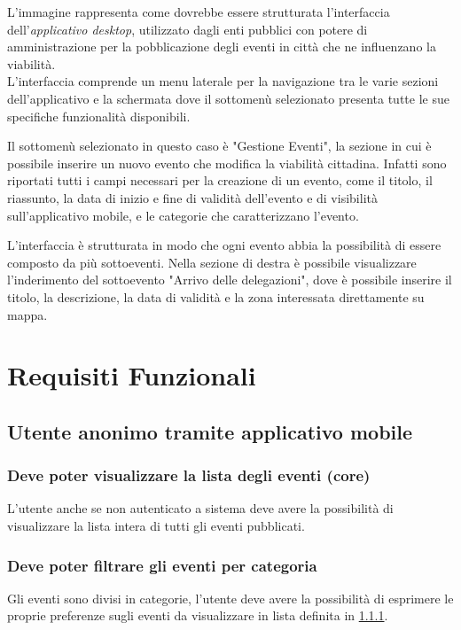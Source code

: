\documentclass{article}
\begin{document}
L'immagine rappresenta come dovrebbe essere strutturata l'interfaccia dell'\textit{applicativo desktop}, utilizzato dagli enti pubblici con potere di amministrazione per la pobblicazione degli eventi in città che ne influenzano la viabilità.\\
L'interfaccia comprende un menu laterale per la navigazione tra le varie sezioni dell'applicativo e la schermata dove il sottomenù selezionato presenta tutte le sue specifiche funzionalità disponibili.

Il sottomenù selezionato in questo caso è "Gestione Eventi", la sezione in cui è possibile inserire un nuovo evento che modifica la viabilità cittadina. Infatti sono riportati tutti i campi necessari per la creazione di un evento, come il titolo, il riassunto, la data di inizio e fine di validità dell'evento e di visibilità sull'applicativo mobile, e le categorie che caratterizzano l'evento.

L'interfaccia è strutturata in modo che ogni evento abbia la possibilità di essere composto da più sottoeventi. Nella sezione di destra è possibile visualizzare l'inderimento del sottoevento "Arrivo delle delegazioni", dove è possibile inserire il titolo, la descrizione, la data di validità e la zona interessata direttamente su mappa.\\

\clearpage

\section{Requisiti Funzionali}

\subsection{Utente anonimo tramite applicativo mobile}

\subsubsection{Deve poter visualizzare la lista degli eventi (core)}\label{Requirements:Lista}
\label{5.1.1}
L'utente anche se non autenticato a sistema deve avere la possibilità di visualizzare la lista intera di tutti gli eventi pubblicati.

\subsubsection{Deve poter filtrare gli eventi per categoria}
\label{5.1.2}
Gli eventi sono divisi in categorie, l'utente deve avere la possibilità di esprimere le proprie preferenze sugli eventi da visualizzare in lista definita in \ref{Requirements:Lista}.
\end{document}
